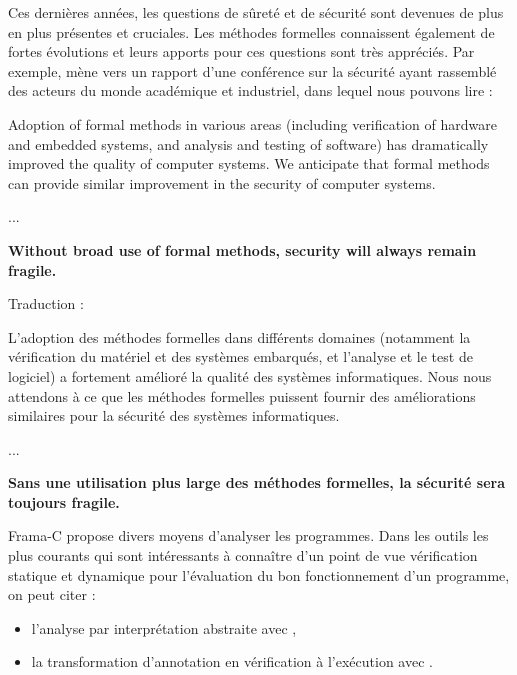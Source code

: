 Ces dernières années, les questions de sûreté et de sécurité sont devenues de
plus en plus présentes et cruciales. Les méthodes formelles connaissent également
de fortes évolutions et leurs apports pour ces questions sont très appréciés.
Par exemple,  mène vers
un rapport d'une conférence sur la sécurité ayant rassemblé des acteurs du monde
académique et industriel, dans lequel nous pouvons lire :



\begin{Quotation}
Adoption of formal methods in various areas (including verification of hardware
and embedded systems, and analysis and testing of software) has dramatically
improved the quality of computer systems.  We anticipate that formal methods
can provide similar improvement in the security of computer systems.

...

\textbf{Without broad use of formal methods, security will always remain fragile.}
\end{Quotation}



\begin{Spoiler}
Traduction :

L'adoption des méthodes formelles dans différents domaines (notamment la
vérification du matériel et des systèmes embarqués, et l'analyse et le test
de logiciel) a fortement amélioré la qualité des systèmes informatiques.
Nous nous attendons à ce que les méthodes formelles puissent fournir des
améliorations similaires pour la sécurité des systèmes informatiques.

...

\textbf{Sans une utilisation plus large des méthodes formelles, la sécurité sera
toujours fragile.}
\end{Spoiler}






Frama-C propose divers moyens d'analyser les programmes. Dans les outils les
plus courants qui sont intéressants à connaître d'un point de vue vérification
statique et dynamique pour l'évaluation du bon fonctionnement d'un programme,
on peut citer :
\begin{itemize}
\item l'analyse par interprétation abstraite avec
,
\item la transformation d'annotation en vérification à l'exécution avec
.
\end{itemize}


